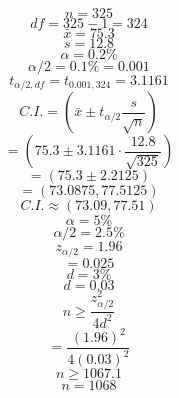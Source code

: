 \documentclass{article}
\begin{document}
    $$n = 325$$
$$df = 325-1 = 324$$
$$\bar{x} = 75.3$$
$$s = 12.8$$
$$\alpha = 0.2\%$$
$$\alpha/2 = 0.1\% = 0.001$$
$$t_{\alpha/2, df} = t_{0.001, 324} = 3.1161$$
$$C.I. = \left(\bar{x} \pm t_{\alpha/2} \frac{s}{\sqrt{n}}\right)$$
$$= \left(75.3 \pm 3.1161 \cdot \frac{12.8}{\sqrt{325}}\right)$$
$$= (75.3 \pm 2.2125)$$
$$= (73.0875, 77.5125)$$
$$C.I. \approx (73.09, 77.51)$$
$$\alpha = 5\%$$
$$\alpha/2 = 2.5\%$$
$$z_{\alpha/2} = 1.96$$
$$= 0.025$$
$$d = 3\%$$
$$d = 0.03$$
$$n \ge \frac{z_{\alpha/2}^2}{4d^2}$$
$$= \frac{(1.96)^2}{4(0.03)^2}$$
$$n \ge 1067.1$$
$$n = 1068$$

    
\end{document}
